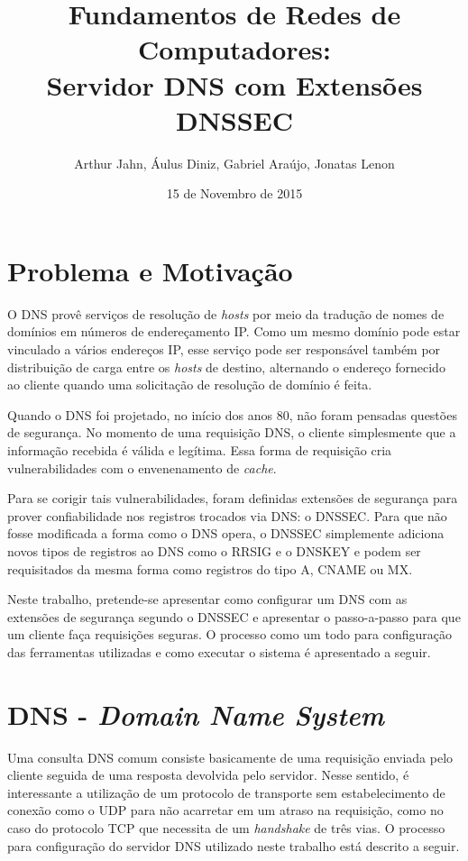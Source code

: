 \documentclass[a4paper]{report} %
\title{Fundamentos de Redes de Computadores: \\ Servidor DNS com Extensões DNSSEC}
\author{Arthur Jahn, Áulus Diniz, Gabriel Araújo, Jonatas Lenon}
\date{15 de Novembro de 2015}    %
\begin{document}
\maketitle  %

\tableofcontents %
\chapter{Problema e Motivação}
\label{chap_problema}

O DNS provê serviços de resolução de \textit{hosts} por meio da tradução de nomes de domínios em números de endereçamento IP. Como um mesmo domínio pode estar vinculado a vários endereços IP, esse serviço pode ser responsável também por distribuição de carga entre os \textit{hosts} de destino, alternando o endereço fornecido ao cliente quando uma solicitação de resolução de domínio é feita. 

Quando o DNS foi projetado, no início dos anos 80, não foram pensadas questões de segurança. No momento de uma requisição DNS, o cliente simplesmente que a informação recebida é válida e legítima. Essa forma de requisição cria vulnerabilidades com o envenenamento de \textit{cache}. 

Para se corigir tais vulnerabilidades, foram definidas extensões de segurança para prover confiabilidade nos registros trocados via DNS: o DNSSEC. Para que não fosse modificada a forma como o DNS opera, o DNSSEC simplemente adiciona novos tipos de registros ao DNS como o RRSIG e o DNSKEY e podem ser requisitados da mesma forma como registros do tipo A, CNAME ou MX.

Neste trabalho, pretende-se apresentar como configurar um DNS com as extensões de segurança segundo o DNSSEC e apresentar o passo-a-passo para que um cliente faça requisições seguras. O processo como um todo para configuração das ferramentas utilizadas e como executar o sistema é apresentado a seguir.

\chapter{DNS  - \textit{Domain Name System}}
\label{chap_dns}

Uma consulta DNS comum consiste basicamente de uma requisição enviada pelo cliente seguida de uma resposta devolvida pelo servidor. Nesse sentido, é interessante a utilização de um protocolo de transporte sem estabelecimento de conexão como o UDP para não acarretar em um atraso na requisição, como no caso do protocolo TCP que necessita de um \textit{handshake} de três vias. O processo para configuração do servidor DNS utilizado neste trabalho está descrito a seguir.
\end{document}
